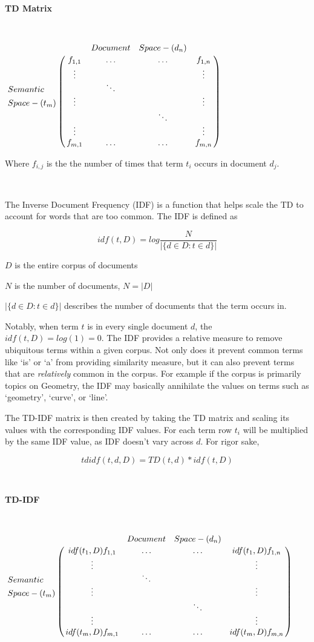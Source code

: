 \documentclass [12pt]{article}
\begin{document}
\begin{center} 
 
      \textbf{TD Matrix}

\

   $ \bordermatrix{ & &  Document &Space - (d_n) &   \cr
       &  f_{1,1} & \ldots &  \ldots &  f_{1, n} \cr
       &  \vdots& &  &  \vdots \cr
      Semantic&   & \ddots  & &   \cr
       Space - (t_m) & \vdots  &  &    &  \vdots\cr
     &    &   &  \ddots  &  \cr
      & \vdots  &  &    &  \vdots\cr
      &  f_{m,1} & \ldots & \ldots &  f_{m, n}}   \qquad$
     
      
 \end{center}
 
 Where $f_{i, j}$ is the the number of times that term $t_i$ occurs in document $d_j$.
 
 \ 
 
 The Inverse Document Frequency (IDF) is a function that helps scale the TD to account for words that are too common. The IDF is defined as 
 
 $$ idf(t, D) = log\frac{N}{|\{d\in D: t \in d\}|}$$
 
 $D$ is the entire corpus of documents
 
 $N$ is the number of documents, $N = |D|$
 
 $|\{d\in D: t \in d\}|$ describes the number of documents that the term occurs in. 
 
 Notably, when term $t$ is in every single document $d$, the $idf(t, D) = log(1) = 0$. The IDF provides a relative measure to remove ubiquitous terms within a given corpus. Not only does it prevent common terms like `is' or `a' from providing similarity measure, but it can also prevent terms that are \emph{relatively} common in the corpus. For example if the corpus is primarily topics on Geometry, the IDF may basically annihilate the values on terms such as `geometry', `curve', or `line'. 
 
 The TD-IDF matrix is then created by taking the TD matrix and scaling its values with the corresponding IDF values. For each term row $t_i$ will be multiplied by the same IDF value, as IDF doesn't vary across $d$. For rigor sake, 
 
 $$ tdidf(t, d, D)  = TD(t, d) * idf(t, D)$$
 
 \
 
 \begin{center} 
  \textbf{TD-IDF}
  
  \
  
$
    \bordermatrix{& &Document &Space - (d_n)      & \cr
       & idf(t_1, D)f_{1,1} & \ldots &  \ldots &  idf(t_1, D) f_{1, n} \cr
       &  \vdots& &  &  \vdots \cr
      Semantic&   & \ddots  & &   \cr
       Space - (t_m) & \vdots  &  &    &  \vdots\cr
     &    &   &  \ddots  &  \cr
      & \vdots  &  &    &  \vdots\cr
      &  idf(t_m, D) f_{m,1} & \ldots & \ldots &  idf(t_m, D) f_{m, n}}   \qquad$
      
   
     
 \end{center}
 
\end{document}
